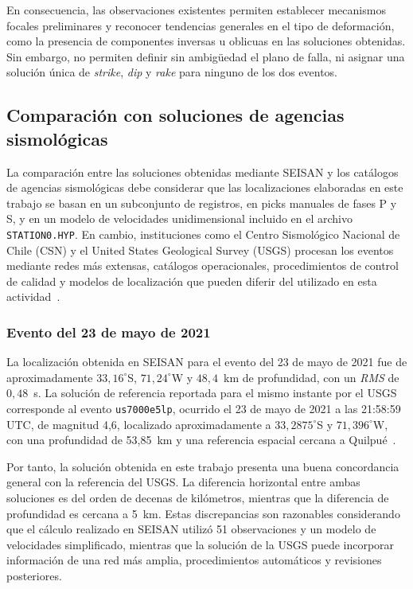 \documentclass[a4paper,12pt]{article} %
\numberwithin{equation}{section} %
\numberwithin{figure}{section} %
\begin{document}
En consecuencia, las observaciones existentes permiten establecer mecanismos focales preliminares y reconocer tendencias generales en el tipo de deformación, como la presencia de componentes inversas u oblicuas en las soluciones obtenidas. Sin embargo, no permiten definir sin ambigüedad el plano de falla, ni asignar una solución única de \textit{strike}, \textit{dip} y \textit{rake} para ninguno de los dos eventos.


\subsection{Comparación con soluciones de agencias sismológicas}

La comparación entre las soluciones obtenidas mediante SEISAN y los catálogos de agencias sismológicas debe considerar que las localizaciones elaboradas en este trabajo se basan en un subconjunto de registros, en picks manuales de fases P y S, y en un modelo de velocidades unidimensional incluido en el archivo \texttt{STATION0.HYP}. En cambio, instituciones como el Centro Sismológico Nacional de Chile (CSN) y el United States Geological Survey (USGS) procesan los eventos mediante redes más extensas, catálogos operacionales, procedimientos de control de calidad y modelos de localización que pueden diferir del utilizado en esta actividad~\cite{CSNEventDatabase,USGSEarthquakeCatalog}.

\subsubsection{Evento del 23 de mayo de 2021}

La localización obtenida en SEISAN para el evento del 23 de mayo de 2021 fue de aproximadamente $33{,}16^\circ$S, $71{,}24^\circ$W y $48{,}4$~km de profundidad, con un \textit{RMS} de $0{,}48$~s. La solución de referencia reportada para el mismo instante por el USGS corresponde al evento \texttt{us7000e5lp}, ocurrido el 23 de mayo de 2021 a las 21:58:59 UTC, de magnitud 4,6, localizado aproximadamente a $33{,}2875^\circ$S y $71{,}396^\circ$W, con una profundidad de 53,85~km y una referencia espacial cercana a Quilpué~\cite{USGS2021Quilpue}.

Por tanto, la solución obtenida en este trabajo presenta una buena concordancia general con la referencia del USGS. La diferencia horizontal entre ambas soluciones es del orden de decenas de kilómetros, mientras que la diferencia de profundidad es cercana a 5~km. Estas discrepancias son razonables considerando que el cálculo realizado en SEISAN utilizó 51 observaciones y un modelo de velocidades simplificado, mientras que la solución de la USGS puede incorporar información de una red más amplia, procedimientos automáticos y revisiones posteriores.
\end{document}
